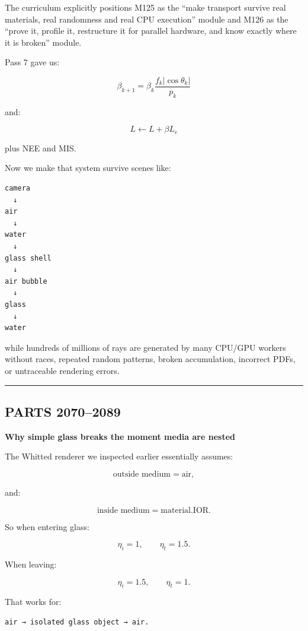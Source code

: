The curriculum explicitly positions M125 as the ``make transport survive real materials, real randomness and real CPU execution'' module and M126 as the ``prove it, profile it, restructure it for parallel hardware, and know exactly where it is broken'' module.

Pass 7 gave us:

\[
\beta_{k+1}
=
\beta_k
\frac{
f_k|\cos\theta_k|
}{
p_k
}
\]

and:

\[
L
\leftarrow
L+
\beta L_e
\]

plus NEE and MIS.

Now we make that system survive scenes like:

\begin{verbatim}
camera
  ↓
air
  ↓
water
  ↓
glass shell
  ↓
air bubble
  ↓
glass
  ↓
water
\end{verbatim}

while hundreds of millions of rays are generated by many CPU/GPU workers without races, repeated random patterns, broken accumulation, incorrect PDFs, or untraceable rendering errors.

\begin{center}\rule{0.5\linewidth}{0.5pt}\end{center}

\subsection{PARTS 2070--2089}\label{03-visual-computing-i-ch010-parts-20702089}

\hypertarget{03-visual-computing-i-ch010-parts-20702089}{}

\textbf{Why simple glass breaks the moment media are nested}

The Whitted renderer we inspected earlier essentially assumes:

\[
\text{outside medium}=\text{air},
\]

and:

\[
\text{inside medium}=\text{material.IOR}.
\]

So when entering glass:

\[
\eta_i=1,
\qquad
\eta_t=1.5.
\]

When leaving:

\[
\eta_i=1.5,
\qquad
\eta_t=1.
\]

That works for:

\begin{verbatim}
air → isolated glass object → air.
\end{verbatim}

